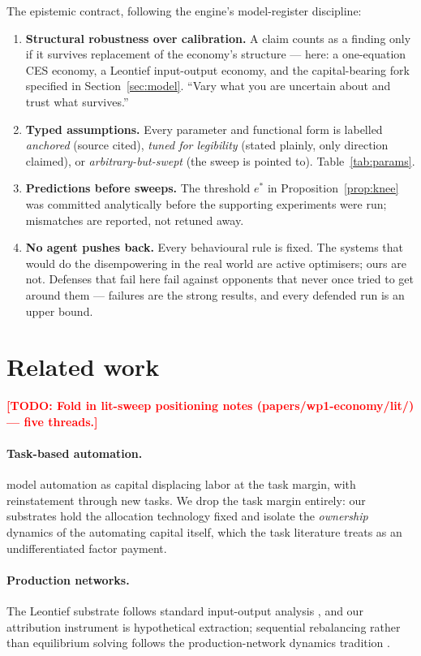 \documentclass[11pt]{article}
\newcommand{\TODO}[1]{\textcolor{red}{\textbf{[TODO: #1]}}}
\begin{document}
The epistemic contract, following the engine's model-register discipline:
\begin{enumerate}
  \item \textbf{Structural robustness over calibration.} A claim counts as a
  finding only if it survives replacement of the economy's structure ---
  here: a one-equation CES economy, a Leontief input-output economy, and the
  capital-bearing fork specified in Section~\ref{sec:model}. ``Vary what you
  are uncertain about and trust what survives.''
  \item \textbf{Typed assumptions.} Every parameter and functional form is
  labelled \emph{anchored} (source cited), \emph{tuned for legibility}
  (stated plainly, only direction claimed), or \emph{arbitrary-but-swept}
  (the sweep is pointed to). Table~\ref{tab:params}.
  \item \textbf{Predictions before sweeps.} The threshold $e^{*}$ in
  Proposition~\ref{prop:knee} was committed analytically before the
  supporting experiments were run; mismatches are reported, not retuned away.
  \item \textbf{No agent pushes back.} Every behavioural rule is fixed. The
  systems that would do the disempowering in the real world are active
  optimisers; ours are not. Defenses that fail here fail against opponents
  that never once tried to get around them --- failures are the strong
  results, and every defended run is an upper bound.
\end{enumerate}

\section{Related work}\label{sec:related}

\TODO{Fold in lit-sweep positioning notes (papers/wp1-economy/lit/) --- five
threads.}

\paragraph{Task-based automation.} \citet{acemoglu2018race} model automation
as capital displacing labor at the task margin, with reinstatement through new
tasks. We drop the task margin entirely: our substrates hold the allocation
technology fixed and isolate the \emph{ownership} dynamics of the automating
capital itself, which the task literature treats as an undifferentiated
factor payment.

\paragraph{Production networks.} The Leontief substrate follows standard
input-output analysis \citep{miller2009io}, and our attribution instrument is
hypothetical extraction; sequential rebalancing rather than equilibrium
solving follows the production-network dynamics tradition
\citep{carvalho2014micro}.
\end{document}
